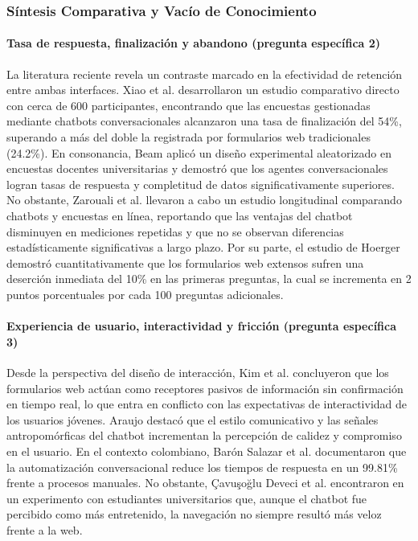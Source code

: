 \documentclass[12pt,letterpaper]{article}
\begin{document}
\subsubsection{Síntesis Comparativa y Vacío de Conocimiento}
 
\paragraph{Tasa de respuesta, finalización y abandono (pregunta específica 2)}
La literatura reciente revela un contraste marcado en la efectividad de retención entre ambas interfaces. Xiao et al. \cite{xiao2020} desarrollaron un estudio comparativo directo con cerca de 600 participantes, encontrando que las encuestas gestionadas mediante chatbots conversacionales alcanzaron una tasa de finalización del 54\%, superando a más del doble la registrada por formularios web tradicionales (24.2\%). En consonancia, Beam \cite{beam2023} aplicó un diseño experimental aleatorizado en encuestas docentes universitarias y demostró que los agentes conversacionales logran tasas de respuesta y completitud de datos significativamente superiores. No obstante, Zarouali et al. \cite{zarouali2023} llevaron a cabo un estudio longitudinal comparando chatbots y encuestas en línea, reportando que las ventajas del chatbot disminuyen en mediciones repetidas y que no se observan diferencias estadísticamente significativas a largo plazo. Por su parte, el estudio de Hoerger \cite{hoerger2010} demostró cuantitativamente que los formularios web extensos sufren una deserción inmediata del 10\% en las primeras preguntas, la cual se incrementa en 2 puntos porcentuales por cada 100 preguntas adicionales.
 
\paragraph{Experiencia de usuario, interactividad y fricción (pregunta específica 3)}
Desde la perspectiva del diseño de interacción, Kim et al. \cite{kim2019} concluyeron que los formularios web actúan como receptores pasivos de información sin confirmación en tiempo real, lo que entra en conflicto con las expectativas de interactividad de los usuarios jóvenes. Araujo \cite{araujo2018} destacó que el estilo comunicativo y las señales antropomórficas del chatbot incrementan la percepción de calidez y compromiso en el usuario. En el contexto colombiano, Barón Salazar et al. \cite{baronsalazar2026} documentaron que la automatización conversacional reduce los tiempos de respuesta en un 99.81\% frente a procesos manuales. No obstante, Çavuşoğlu Deveci et al. \cite{devecifuchs2026} encontraron en un experimento con estudiantes universitarios que, aunque el chatbot fue percibido como más entretenido, la navegación no siempre resultó más veloz frente a la web.
 
\end{document}
